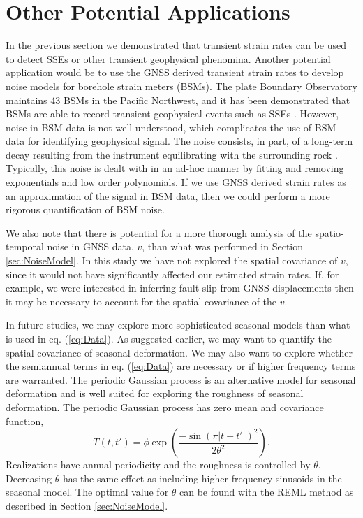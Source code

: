 \documentclass[10pt,a4paper]{article}
\begin{document}
\section{Other Potential Applications}\label{sec:Other}
In the previous section we demonstrated that transient strain rates can be used to detect SSEs or other transient geophysical phenomina.  Another potential application would be to use the GNSS derived transient strain rates to develop noise models for borehole strain meters (BSMs).  The plate Boundary Observatory maintains 43 BSMs in the Pacific Northwest, and it has been demonstrated that BSMs are able to record transient geophysical events such as SSEs \citep[e.g.,][]{Dragert2011}. However, noise in BSM data is not well understood, which complicates the use of BSM data for identifying geophysical signal. The noise consists, in part, of a long-term decay resulting from the instrument equilibrating with the surrounding rock \citep{Gladwin1987}. Typically, this noise is dealt with in an ad-hoc manner by fitting and removing exponentials and low order polynomials. If we use GNSS derived strain rates as an approximation of the signal in BSM data, then we could perform a more rigorous quantification of BSM noise.    

We also note that there is potential for a more thorough analysis of the spatio-temporal noise in GNSS data, $v$, than what was performed in Section \ref{sec:NoiseModel}. In this study we have not explored the spatial covariance of $v$, since it would not have significantly affected our estimated strain rates. If, for example, we were interested in inferring fault slip from GNSS displacements then it may be necessary to account for the spatial covariance of the $v$.  

In future studies, we may explore more sophisticated seasonal models than what is used in eq. (\ref{eq:Data}). As suggested earlier, we may want to quantify the spatial covariance of seasonal deformation.  We may also want to explore whether the semiannual terms in eq. (\ref{eq:Data}) are necessary or if higher frequency terms are warranted.  The periodic Gaussian process \citep{Mackay1998} is an alternative model for seasonal deformation and is well suited for exploring the roughness of seasonal deformation.  The periodic Gaussian process has zero mean and covariance function,
\begin{equation}\label{eq:Periodic}
T(t,t') = \phi \exp\left(\frac{-\sin(\pi|t - t'|)^2}{2\theta^2}\right).
\end{equation}
Realizations have annual periodicity and the roughness is controlled by $\theta$. Decreasing $\theta$ has the same effect as including higher frequency sinusoids in the seasonal model. The optimal value for $\theta$ can be found with the REML method as described in Section \ref{sec:NoiseModel}. 
\end{document}
